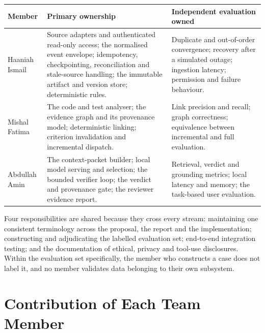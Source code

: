 \begin{longtable}{>{\raggedright\arraybackslash}p{}>{\raggedright\arraybackslash}p{}>{\raggedright\arraybackslash}p{}}
\toprule
Member & Primary ownership & Independent evaluation owned \\
\midrule
\endhead
Haaniah Ismail
  & Source adapters and authenticated read-only access; the normalised event
    envelope; idempotency, checkpointing, reconciliation and stale-source
    handling; the immutable artifact and version store; deterministic rules.
  & Duplicate and out-of-order convergence; recovery after a simulated outage;
    ingestion latency; permission and failure behaviour. \\
Mishal Fatima
  & The code and test analyser; the evidence graph and its provenance model;
    deterministic linking; criterion invalidation and incremental dispatch.
  & Link precision and recall; graph correctness; equivalence between
    incremental and full evaluation. \\
Abdullah Amin
  & The context-packet builder; local model serving and selection; the bounded
    verifier loop; the verdict and provenance gate; the reviewer evidence
    report.
  & Retrieval, verdict and grounding metrics; local latency and memory; the
    task-based user evaluation. \\
\bottomrule
\end{longtable}

Four responsibilities are shared because they cross every stream: maintaining
one consistent terminology across the proposal, the report and the
implementation; constructing and adjudicating the labelled evaluation set;
end-to-end integration testing; and the documentation of ethical, privacy and
tool-use disclosures. Within the evaluation set specifically, the member who
constructs a case does not label it, and no member validates data belonging to
their own subsystem.

\section{Contribution of Each Team Member}


